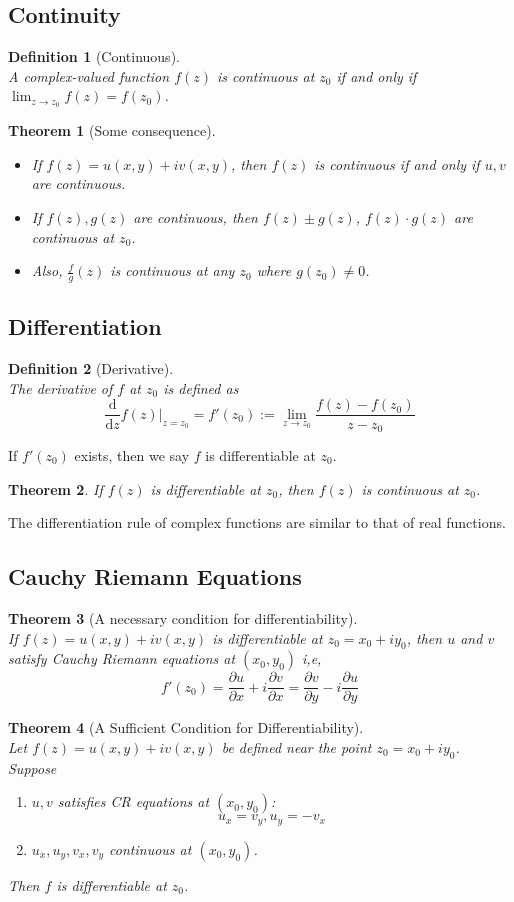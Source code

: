 \documentclass[12pt]{article}
\newcommand{\diff}{\mathrm{d}}
\newtheorem{definition}{Definition}[section]
\newtheorem{theorem}{Theorem}[section]
\theoremstyle{definition}
\begin{document}
\subsection{Continuity}
\begin{definition}[Continuous]
\hfill\\\normalfont A complex-valued function $f(z)$ is continuous at $z_0$ if and only if $\lim_{z\to z_0}f(z) = f(z_0)$.
\end{definition}
\begin{theorem}[Some consequence]
\hfill\\\normalfont 
\begin{itemize}
	\item If $f(z)=u(x,y)+iv(x,y)$, then $f(z)$ is continuous if and only if $u,v$ are continuous.
	\item If $f(z), g(z)$ are continuous, then $f(z)\pm g(z)$, $f(z)\cdot g(z)$ are continuous at $z_0$.
	\item Also, $\frac{f}{g}(z)$ is continuous at any $z_0$ where $g(z_0)\neq 0$.
\end{itemize}
\end{theorem}
\subsection{Differentiation}
\begin{definition}[Derivative]
\hfill\\\normalfont The derivative of $f$ at $z_0$ is defined as
\[
\frac{\diff}{\diff z}f(z)|_{z=z_0} = f'(z_0):=\lim_{z\to z_0}\frac{f(z)-f(z_0)}{z-z_0}
\]
\end{definition}
If $f'(z_0)$ exists, then we say $f$ is differentiable at $z_0$.
\begin{theorem}\normalfont If $f(z)$ is differentiable at $z_0$, then $f(z)$ is continuous at $z_0$.
\end{theorem}
The differentiation rule of complex functions are similar to that of real functions.
\subsection{Cauchy Riemann Equations}
\begin{theorem}[A necessary condition for differentiability]
\hfill\\\normalfont If $f(z)=u(x,y)+iv(x,y)$ is differentiable at $z_0 = x_0 + iy_0$, then $u$ and $v$ satisfy Cauchy Riemann equations at $(x_0, y_0)$ i,e,
\[
f'(z_0)=\frac{\partial u}{\partial x} + i\frac{\partial v}{\partial x}=\frac{\partial v}{\partial y}-i\frac{\partial u}{\partial y}
\]
\end{theorem}
\begin{theorem}[A Sufficient Condition for Differentiability]
\hfill\\\normalfont Let $f(z)=u(x,y)+iv(x,y)$ be defined near the point $z_0 = x_0 + iy_0$. Suppose
\begin{enumerate}
	\item $u, v$ satisfies CR equations at $(x_0,y_0)$:\[
u_x=v_y, u_y=-v_x
	\]
	\item $u_x,u_y,v_x,v_y$ continuous at $(x_0, y_0)$.
\end{enumerate}
Then $f$ is differentiable at $z_0$.
\end{theorem}
\end{document}
